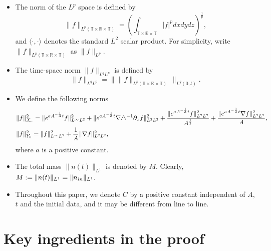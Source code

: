 \documentclass[12pt, reqno]{amsart}
\numberwithin{equation}{section}
\begin{document}
\begin{itemize}
		$\partial_1,$ $\partial_2,$ and $\partial_3,$  respectively.
		\item The norm of the $L^p$ space is defined by
		$$\|f\|_{L^p(\mathbb{T}\times\mathbb{R}\times\mathbb{T})}=\left(\int_{\mathbb{T}\times\mathbb{R}\times\mathbb{T}}|f|^p dxdydz\right)^{\frac{1}{p}},$$
		and $\langle\cdot,\cdot\rangle$ denotes the standard $L^2$ scalar product. For simplicity, write $\|f\|_{L^p(\mathbb{T}\times\mathbb{R}\times\mathbb{T})}$ as $\|f\|_{L^p}.$
		\item The time-space norm  $\|f\|_{L^qL^p}$ is defined by
		$$\|f\|_{L^qL^p}=\big\|  \|f\|_{L^p(\mathbb{T}\times\mathbb{R}\times\mathbb{T})}\ \big\|_{L^q(0,t)}.$$
		\item We define the following norms 
		\begin{equation*}%
			\begin{aligned}
				&\|f\|_{X_{a}}^2
				=\|{\rm e}^{aA^{-\frac{1}{3}}t}f\|^2_{L^{\infty}L^{2}}
				+\|{\rm e}^{aA^{-\frac{1}{3}}t}\nabla\triangle^{-1}\partial_{x} f\|^2_{L^{2}L^{2}} 
				+\frac{\|{\rm e}^{aA^{-\frac{1}{3}}t}f\|^2_{L^{2}L^{2}}}{A^{\frac{1}{3}}}
				+\frac{\|{\rm e}^{aA^{-\frac{1}{3}}t}\nabla f\|^2_{L^{2}L^{2}}}{A},\\
				&\|f\|_{Y_{0}}^2
				=\|f\|^2_{L^{\infty}L^{2}}
				+\frac{1}{A}\|\nabla f\|^2_{L^{2}L^{2}},
			\end{aligned}
		\end{equation*}
		where $a$ is a positive constant.
		
		\item The total mass $ \|n(t)\|_{L^{1}}$ is denoted by $ M .$ Clearly, $ M:=\|n(t)\|_{L^{1}}=\|n_{\rm in}\|_{L^{1}}.$
		
		\item Throughout this paper, we denote $C$ by  a positive constant independent of $A$, $t$ and the initial data, and it may be different from line to line.
	\end{itemize}
	
	\section{Key ingredients in the proof}
	
\end{document}
